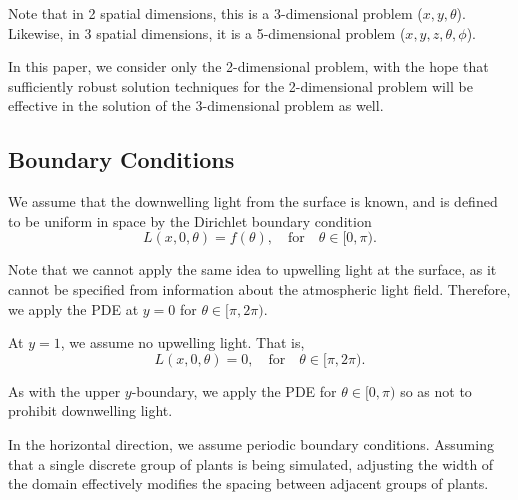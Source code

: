 Note that in 2 spatial dimensions, this is a 3-dimensional problem ($x,y,\theta$).
Likewise, in 3 spatial dimensions, it is a 5-dimensional problem ($x,y,z,\theta,\phi$).

In this paper, we consider only the 2-dimensional problem, with the hope that sufficiently robust solution techniques for the 2-dimensional problem will be effective in the solution of the 3-dimensional problem as well.

\subsection{Boundary Conditions}
We assume that the downwelling light from the surface is known, and is defined to be uniform in space by the Dirichlet boundary condition
\begin{equation}
    L(x,0,\theta) = f(\theta), \quad \mbox{for} \quad \theta \in [0,\pi).
    \label{eq:surf_bc}
\end{equation}

Note that we cannot apply the same idea to upwelling light at the surface, as it cannot be specified from information about the atmospheric light field.
Therefore, we apply the PDE at $y=0$ for $\theta \in [\pi,2\pi)$.

At $y=1$, we assume no upwelling light.
That is,
\begin{equation}
    L(x,0,\theta) = 0, \quad \mbox{for} \quad \theta \in [\pi,2\pi).
    \label{eq:bottom_bc}
\end{equation}

As with the upper $y$-boundary, we apply the PDE for $\theta \in [0,\pi)$ so as not to prohibit downwelling light.

In the horizontal direction, we assume periodic boundary conditions.
Assuming that a single discrete group of plants is being simulated, adjusting the width of the domain effectively modifies the spacing between adjacent groups of plants.

